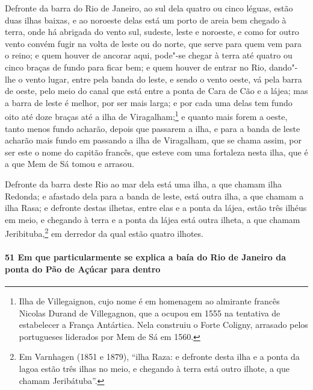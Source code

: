 Defronte da barra do Rio de Janeiro, ao sul dela quatro ou cinco léguas, estão duas ilhas
baixas, e ao noroeste delas está um porto de areia bem chegado à terra, onde há abrigada
do vento sul, sudeste, leste e noroeste, e como for outro vento convém fugir na volta de
leste ou do norte, que serve para quem vem para o reino; e quem houver de ancorar aqui,
pode"-se chegar à terra até quatro ou cinco braças de fundo para ficar bem; e quem houver
de entrar no Rio, dando"-lhe o vento lugar, entre pela banda do leste, e sendo o vento
oeste, vá pela barra de oeste, pelo meio do canal que está entre a ponta de Cara de Cão e
a lájea; mas a barra de leste é melhor, por ser mais larga; e por cada uma delas tem fundo
oito até doze braças até a ilha de Viragalham;\footnote{ Ilha de Villegaignon, cujo nome é
em homenagem ao almirante francês Nicolas Durand de Villegagnon, que a ocupou em 1555 na
tentativa de estabelecer a França Antártica. Nela construiu o Forte Coligny, arrasado
pelos portugueses liderados por Mem de Sá em 1560.} e quanto mais forem a oeste, tanto
menos fundo acharão, depois que passarem a ilha, e para a banda de leste acharão mais
fundo em passando a ilha de Viragalham, que se chama assim, por ser este o nome do capitão
francês, que esteve com uma fortaleza nesta ilha, que é a que Mem de Sá tomou e arrasou.

Defronte da barra deste Rio ao mar dela está uma ilha, a que chamam ilha Redonda; e
afastado dela para a banda de leste, está outra ilha, a que chamam a ilha Rasa; e defronte
destas ilhetas, entre elas e a ponta da lájea, estão três ilhéus em meio, e chegando à
terra e a ponta da lájea está outra ilheta, a que chamam Jeribituba,\footnote{ Em
Varnhagen (1851 e 1879), ``ilha Raza: e defronte desta ilha e a ponta da lagoa estão três
ilhas no meio, e chegando à terra está outro ilhote, a que chamam Jeribátuba''.} em
derredor da qual estão quatro ilhotes.

\paragraph{51 Em que particularmente se explica a baía do Rio de Janeiro da ponta do Pão
de Açúcar para dentro}

